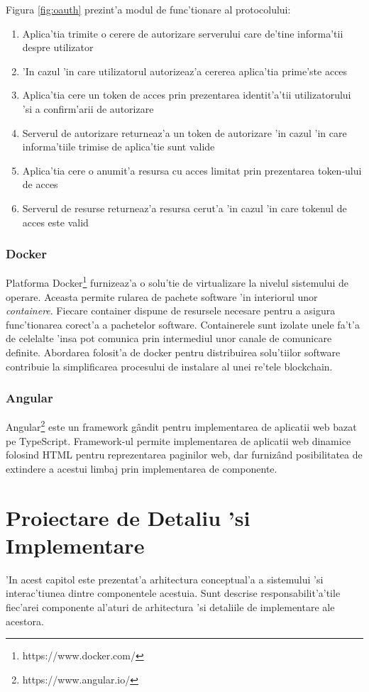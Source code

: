 \documentclass[12pt,a4paper,twoside]{report}
\begin{document}
Figura \ref{fig:oauth} prezint'a modul de func'tionare al protocolului:
\begin{enumerate}
    \item Aplica'tia trimite o cerere de autorizare serverului care de'tine informa'tii despre utilizator
    \item 'In cazul 'in care utilizatorul autorizeaz'a cererea aplica'tia prime'ste acces
    \item Aplica'tia cere un token de acces prin prezentarea identit'a'tii utilizatorului 'si a confirm'arii de autorizare
    \item Serverul de autorizare returneaz'a un token de autorizare 'in cazul 'in care informa'tiile trimise de aplica'tie sunt valide
    \item Aplica'tia cere o anumit'a resursa cu acces limitat prin prezentarea token-ului de acces
    \item Serverul de resurse returneaz'a resursa cerut'a 'in cazul 'in care tokenul de acces este valid
    \end{enumerate}
    
\subsection{Docker}
    Platforma Docker\footnote{https://www.docker.com/} furnizeaz'a o solu'tie de virtualizare la nivelul sistemului de operare. Aceasta permite rularea de pachete software 'in interiorul unor \emph{containere}. Fiecare container dispune de resursele necesare pentru a asigura func'tionarea corect'a a pachetelor software. Containerele sunt izolate unele fa't'a de celelalte 'insa pot comunica prin intermediul unor canale de comunicare definite. Abordarea folosit'a de docker pentru distribuirea solu'tiilor software contribuie la simplificarea procesului de instalare al unei re'tele blockchain.
\subsection{Angular}
    Angular\footnote{https://www.angular.io/} este un framework g\^andit pentru implementarea de aplicatii web bazat pe TypeScript. Framework-ul permite implementarea de aplicatii web dinamice folosind HTML pentru reprezentarea paginilor web, dar furniz\^and posibilitatea de extindere a acestui limbaj prin implementarea de componente. 



\newpage
\thispagestyle{empty}
\mbox{}

\chapter{Proiectare de Detaliu 'si Implementare}
    'In acest capitol este prezentat'a arhitectura conceptual'a a sistemului 'si interac'tiunea dintre componentele acestuia. Sunt descrise responsabilit'a'tile fiec'arei componente al'aturi de arhitectura 'si detaliile de implementare ale acestora.
    
\end{document}
